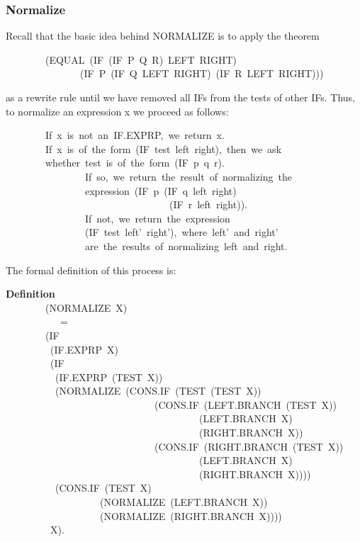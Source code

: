 \documentclass[10pt]{book}
\newenvironment{pubasis}{\begin{flushleft}}{\end{flushleft}}
\newcommand{\axiomordefinition}[1]{\vspace{6pt}\Large\textsf{\textbf{#1}}\normalsize}
\begin{document}
\subsubsection{Normalize}
 Recall that the basic idea behind NORMALIZE is to apply the
theorem
\begin{pubasis}
~~~~~~~~(EQUAL~(IF~(IF~P~Q~R)~LEFT~RIGHT)\\
~~~~~~~~~~~~~~~(IF~P~(IF~Q~LEFT~RIGHT)~(IF~R~LEFT~RIGHT)))\\
\end{pubasis}
as a rewrite rule until we have removed all IFs from the tests
of other IFs.  Thus, to
normalize an expression x we proceed as follows:
\begin{pubasis}
~~~~~~~~If~x~is~not~an~IF.EXPRP,~we~return~x.\\

~~~~~~~~If~x~is~of~the~form~(IF~test~left~right),~then~we~ask\\
~~~~~~~~whether~test~is~of~the~form~(IF~p~q~r).\\

~~~~~~~~~~~~~~~~If~so,~we~return~the~result~of~normalizing~the\\
~~~~~~~~~~~~~~~~expression~(IF~p~(IF~q~left~right)\\
~~~~~~~~~~~~~~~~~~~~~~~~~~~~~~~~~(IF~r~left~right)).\\

~~~~~~~~~~~~~~~~If~not,~we~return~the~expression\\
~~~~~~~~~~~~~~~~(IF~test~left'~right'),~where~left'~and~right'\\
~~~~~~~~~~~~~~~~are~the~results~of~normalizing~left~and~right.\\
\end{pubasis}
The formal definition of this process is:
\begin{pubasis}
\axiomordefinition{Definition}\\
~~~~~~~~(NORMALIZE~X)\\
~~~~~~~~~~~=\\
~~~~~~~~(IF\\
~~~~~~~~~(IF.EXPRP~X)\\
~~~~~~~~~(IF\\
~~~~~~~~~~(IF.EXPRP~(TEST~X))\\
~~~~~~~~~~(NORMALIZE~(CONS.IF~(TEST~(TEST~X))\\
~~~~~~~~~~~~~~~~~~~~~~~~~~~~~~(CONS.IF~(LEFT.BRANCH~(TEST~X))\\
~~~~~~~~~~~~~~~~~~~~~~~~~~~~~~~~~~~~~~~(LEFT.BRANCH~X)\\
~~~~~~~~~~~~~~~~~~~~~~~~~~~~~~~~~~~~~~~(RIGHT.BRANCH~X))\\
~~~~~~~~~~~~~~~~~~~~~~~~~~~~~~(CONS.IF~(RIGHT.BRANCH~(TEST~X))\\
~~~~~~~~~~~~~~~~~~~~~~~~~~~~~~~~~~~~~~~(LEFT.BRANCH~X)\\
~~~~~~~~~~~~~~~~~~~~~~~~~~~~~~~~~~~~~~~(RIGHT.BRANCH~X))))\\
~~~~~~~~~~(CONS.IF~(TEST~X)\\
~~~~~~~~~~~~~~~~~~~(NORMALIZE~(LEFT.BRANCH~X))\\
~~~~~~~~~~~~~~~~~~~(NORMALIZE~(RIGHT.BRANCH~X))))\\
~~~~~~~~~X).\\
\end{pubasis}
\end{document}

